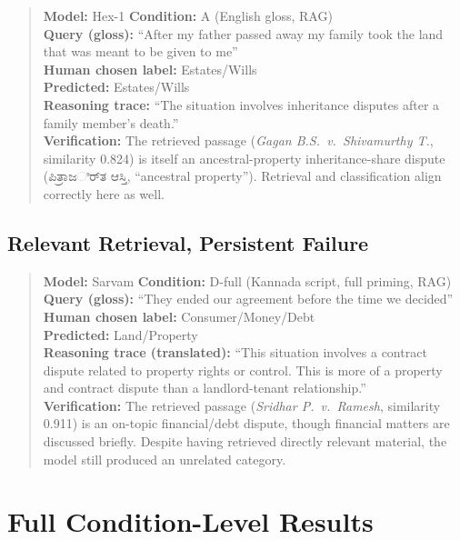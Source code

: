 \documentclass[11pt]{article}
\begin{document}
\begin{quote}
\textbf{Model:} Hex-1 \quad \textbf{Condition:} A (English gloss, RAG) \\
\textbf{Query (gloss):} ``After my father passed away my family took the land that was meant to be given to me'' \\
\textbf{Human chosen label:} Estates/Wills\\
\quad \textbf{Predicted:} Estates/Wills \\
\textbf{Reasoning trace:} ``The situation involves inheritance disputes
after a family member's death.'' \\
\textbf{Verification:} The retrieved passage (\textit{Gagan B.S.\ v.\
Shivamurthy T.}, similarity 0.824) is itself an ancestral-property
inheritance-share dispute ({\kannadafont ಪಿತ್ರಾಜರ್ಿತ
ಆಸ್ತಿ}, ``ancestral property''). Retrieval and classification align
correctly here as well.
\end{quote}

\subsection{Relevant Retrieval, Persistent Failure}
\label{app:relevantfail}

\begin{quote}
\textbf{Model:} Sarvam \quad \textbf{Condition:} D-full (Kannada script, full priming, RAG) \\
\textbf{Query (gloss):} ``They ended our agreement before the time we decided'' \\
\textbf{Human chosen label:} Consumer/Money/Debt\\ 
\quad \textbf{Predicted:} Land/Property \\
\textbf{Reasoning trace (translated):} ``This situation involves a
contract dispute related to property rights or control. This is more of
a property and contract dispute than a landlord-tenant relationship.'' \\
\textbf{Verification:} The retrieved passage (\textit{Sridhar P.\ v.\
Ramesh}, similarity 0.911) is an on-topic financial/debt
dispute, though financial matters are discussed briefly. Despite having retrieved directly relevant material, the model still produced an unrelated category.
\end{quote}

\section{Full Condition-Level Results}
\label{app:full-findings}
\end{document}
